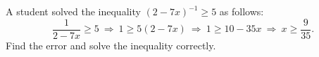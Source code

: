 A student solved the inequality $(2-7x)^{-1}\ge5$ as follows:
\[\dfrac{1}{2-7x}\ge5\ \Longrightarrow\ 1\ge5(2-7x)\ \Longrightarrow\ 1\ge10-35x\ \Longrightarrow\ x\ge\dfrac{9}{35}.\]
Find the error and solve the inequality correctly.
